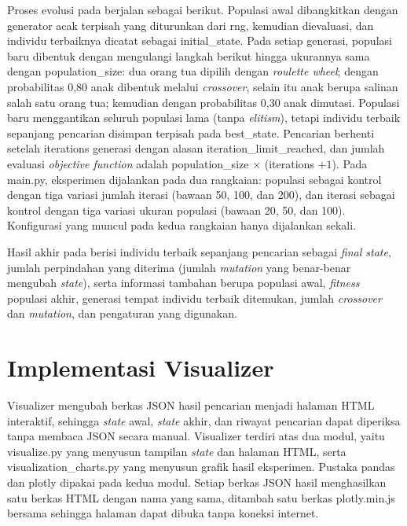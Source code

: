 
Proses evolusi pada  berjalan sebagai berikut. Populasi awal dibangkitkan dengan generator acak terpisah yang diturunkan dari rng, kemudian dievaluasi, dan individu terbaiknya dicatat sebagai initial\_state. Pada setiap generasi, populasi baru dibentuk dengan mengulangi langkah berikut hingga ukurannya sama dengan population\_size: dua orang tua dipilih dengan \textit{roulette wheel}; dengan probabilitas 0,80 anak dibentuk melalui \textit{crossover}, selain itu anak berupa salinan salah satu orang tua; kemudian dengan probabilitas 0,30 anak dimutasi. Populasi baru menggantikan seluruh populasi lama (tanpa \textit{elitism}), tetapi individu terbaik sepanjang pencarian disimpan terpisah pada best\_state. Pencarian berhenti setelah iterations generasi dengan alasan iteration\_limit\_reached, dan jumlah evaluasi \textit{objective function} adalah population\_size $\times$ (iterations $+ 1$). Pada main.py, eksperimen dijalankan pada dua rangkaian: populasi sebagai kontrol dengan tiga variasi jumlah iterasi (bawaan 50, 100, dan 200), dan iterasi sebagai kontrol dengan tiga variasi ukuran populasi (bawaan 20, 50, dan 100). Konfigurasi yang muncul pada kedua rangkaian hanya dijalankan sekali.


Hasil akhir pada  berisi individu terbaik sepanjang pencarian sebagai \textit{final state}, jumlah perpindahan yang diterima (jumlah \textit{mutation} yang benar-benar mengubah \textit{state}), serta informasi tambahan berupa populasi awal, \textit{fitness} populasi akhir, generasi tempat individu terbaik ditemukan, jumlah \textit{crossover} dan \textit{mutation}, dan pengaturan yang digunakan.


\section{Implementasi Visualizer}
\label{sec:visualizer-impl}

Visualizer mengubah berkas JSON hasil pencarian menjadi halaman HTML interaktif, sehingga \textit{state} awal, \textit{state} akhir, dan riwayat pencarian dapat diperiksa tanpa membaca JSON secara manual. Visualizer terdiri atas dua modul, yaitu visualize.py yang menyusun tampilan \textit{state} dan halaman HTML, serta visualization\_charts.py yang menyusun grafik hasil eksperimen. Pustaka pandas dan plotly dipakai pada kedua modul. Setiap berkas JSON hasil menghasilkan satu berkas HTML dengan nama yang sama, ditambah satu berkas plotly.min.js bersama sehingga halaman dapat dibuka tanpa koneksi internet.

